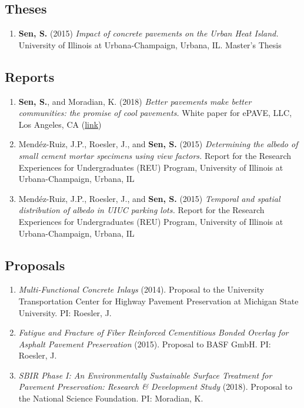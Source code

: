 \documentclass[12pt]{article}
\begin{document}
\subsection*{Theses}
\begin{enumerate}[label=(T\arabic*)]
	\item \textbf{Sen, S.} (2015) \textit{Impact of concrete pavements on the 		Urban Heat Island.} University of Illinois at Urbana-Champaign, Urbana, IL. Master’s Thesis
\end{enumerate}

\subsection*{Reports}
\begin{enumerate}[label=(R\arabic*)]
	\item \textbf{Sen, S.}, and Moradian, K. (2018) \textit{Better pavements make better communities: the promise of cool pavements.} White paper for ePAVE, LLC, Los Angeles, CA (\href{http://www.epavellc.com/wp-content/uploads/ePAVE-White-Paper.pdf}{link})
	\item Mend\'ez-Ruiz, J.P., Roesler, J., and \textbf{Sen, S.} (2015) \textit{Determining the albedo of small cement mortar specimens using view factors.} Report for the Research Experiences for Undergraduates (REU) Program, University of Illinois at Urbana-Champaign, Urbana, IL
	\item Mend\'ez-Ruiz, J.P., Roesler, J., and \textbf{Sen, S.} (2015) \textit{Temporal and spatial distribution of albedo in UIUC parking lots.} Report for the Research Experiences for Undergraduates (REU) Program, University of Illinois at Urbana-Champaign, Urbana, IL
	
\end{enumerate}

\subsection*{Proposals}
\begin{enumerate}[label=(P\arabic*)]
	\item \textit{Multi-Functional Concrete Inlays} (2014). Proposal to the University Transportation Center for Highway Pavement Preservation at Michigan State University. PI: Roesler, J. 
	\item \textit{Fatigue and Fracture of Fiber Reinforced Cementitious Bonded Overlay for Asphalt Pavement Preservation} (2015). Proposal to BASF GmbH. PI: Roesler, J. 
	\item \textit{SBIR Phase I: An Environmentally Sustainable Surface Treatment for Pavement Preservation: Research \& Development Study} (2018). Proposal to the National Science Foundation. PI: Moradian, K.
\end{enumerate}
\end{document}
